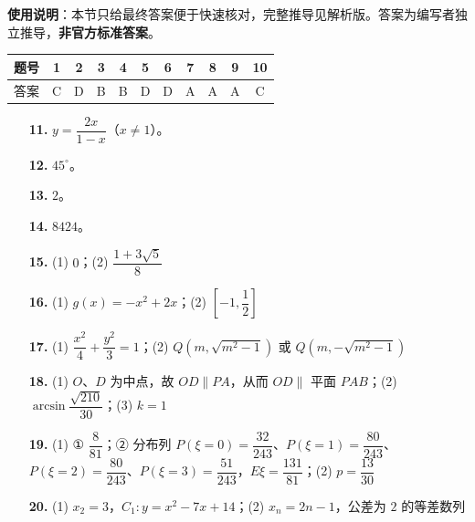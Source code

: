 
\begin{gknotice}
\textbf{使用说明}：本节只给最终答案便于快速核对，完整推导见解析版。答案为编写者独立推导，\textbf{非官方标准答案}。
\end{gknotice}

\begin{center}\begin{tabular}{ccccccccccc}
\toprule
题号 & 1 & 2 & 3 & 4 & 5 & 6 & 7 & 8 & 9 & 10 \\
\midrule
答案 & C & D & B & B & D & D & A & A & A & C \\
\bottomrule
\end{tabular}\end{center}

\begin{itemize}[leftmargin=2.6em]
  \item[\textbf{11.}] $y = \dfrac{2x}{1 - x}$（$x \neq 1$）。
  \item[\textbf{12.}] $45^\circ$。
  \item[\textbf{13.}] $2$。
  \item[\textbf{14.}] $8424$。
\end{itemize}

\begin{itemize}[leftmargin=2.6em]
  \item[\textbf{15.}] (1) $0$；(2) $\dfrac{1 + 3\sqrt{5}}{8}$
  \item[\textbf{16.}] (1) $g(x) = -x^2 + 2x$；(2) $\left[-1, \dfrac{1}{2}\right]$
  \item[\textbf{17.}] (1) $\dfrac{x^2}{4} + \dfrac{y^2}{3} = 1$；(2) $Q\left(m, \sqrt{m^2 - 1}\right)$ 或 $Q\left(m, -\sqrt{m^2 - 1}\right)$
  \item[\textbf{18.}] (1) $O$、$D$ 为中点，故 $OD \parallel PA$，从而 $OD \parallel$ 平面 $PAB$；(2) $\arcsin\dfrac{\sqrt{210}}{30}$；(3) $k = 1$
  \item[\textbf{19.}] (1) ① $\dfrac{8}{81}$；② 分布列 $P(\xi = 0) = \dfrac{32}{243}$、$P(\xi = 1) = \dfrac{80}{243}$、$P(\xi = 2) = \dfrac{80}{243}$、$P(\xi = 3) = \dfrac{51}{243}$，$E\xi = \dfrac{131}{81}$；(2) $p = \dfrac{13}{30}$
  \item[\textbf{20.}] (1) $x_2 = 3$，$C_1: y = x^2 - 7x + 14$；(2) $x_n = 2n - 1$，公差为 $2$ 的等差数列
\end{itemize}
